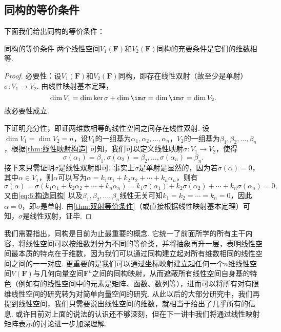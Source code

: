\subsection{同构的等价条件}

下面我们给出同构的等价条件：
\begin{theorem}{}{同构的等价条件}
    两个线性空间$V_1(\mathbf{F})$和$V_2(\mathbf{F})$同构的充要条件是它们的维数相等.
\end{theorem}

\begin{proof}
    必要性：设$V_1(\mathbf{F})$和$V_2(\mathbf{F})$同构，即存在线性双射（故至少是单射）$\sigma:V_1\to V_2$. 由线性映射基本定理，
    \[\dim V_1=\dim\ker\sigma+\dim\im\sigma=\dim\im\sigma=\dim V_2.\]
    故必要性成立.

    下证明充分性，即证两维数相等的线性空间之间存在线性双射. 设$\dim V_1=\dim V_2=n$，设$V_1$的一组基为$\alpha_1,\alpha_2,\ldots,\alpha_n$，$V_2$的一组基为$\beta_1,\beta_2,\ldots,\beta_n$，根据\autoref{thm:线性映射构造} 可知，我们可以定义线性映射$\sigma:V_1\to V_2$，使得
    \begin{equation}\label{eq:6:构造同构}
        \sigma(\alpha_1)=\beta_1,\sigma(\alpha_2)=\beta_2,\ldots,\sigma(\alpha_n)=\beta_n.
    \end{equation}
    接下来只需证明$\sigma$是线性双射即可. 事实上$\sigma$是单射是显然的，因为若$\sigma(\alpha)=0$，其中$\alpha\in V_1$，则$\alpha$可以写为$\alpha=k_1\alpha_1+k_2\alpha_2+\cdots+k_n\alpha_n$，则有
    \[\sigma(\alpha)=\sigma(k_1\alpha_1+k_2\alpha_2+\cdots+k_n\alpha_n)=k_1\sigma(\alpha_1)+k_2\sigma(\alpha_2)+\cdots+k_n\sigma(\alpha_n)=0,\]
    又由\autoref{eq:6:构造同构} 以及$\beta_1,\beta_2,\ldots,\beta_n$线性无关可知$k_1=k_2=\cdots=k_n=0$，因此$\alpha=0$，即$\sigma$是单射. 由\autoref{thm:双射等价条件}（或直接根据线性映射基本定理）可知，$\sigma$是线性双射，证毕.
\end{proof}

我们需要指出，同构是目前为止最重要的概念. 它统一了前面所学的所有主干内容，将线性空间可以按维数划分为不同的等价类，并将抽象再升一层，表明线性空间最本质的特点在于维数，因为我们可以通过同构建立起对所有维数相同的线性空间之间的一一对应. 更重要的是我们可以通过坐标映射建立起任何一个$n$维线性空间$V(\mathbf{F})$与几何向量空间$\mathbf{F}^n$之间的同构映射，从而遮蔽所有线性空间自身基的特色（例如有的线性空间中的元素是矩阵、函数、数列等），进而可以将所有对有限维线性空间的研究转为对简单向量空间的研究. 从此以后的大部分研究中，我们再提到线性空间，我们只需要说出线性空间的维数，就相当于给出了几乎所有的信息. 或许目前对上面的说法的认识还不够深刻，但在下一讲中我们将通过线性映射矩阵表示的讨论进一步加深理解.

